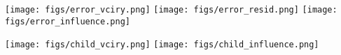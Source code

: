 \documentclass[12pt]{article}
\begin{document}
\begin{center}
\texttt{[image: figs/error\_vciry.png]}
\texttt{[image: figs/error\_resid.png]}
\texttt{[image: figs/error\_influence.png]}

\newpage

\texttt{[image: figs/child\_vciry.png]}
\texttt{[image: figs/child\_influence.png]}

\end{center}
\end{document}
